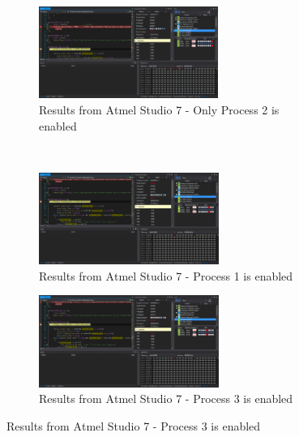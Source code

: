 \documentclass{article}
\begin{document}
	\begin{figure}[h!]
		\centering
		\begin{subfigure}[t]{0.5\textwidth}
			\centering
			\includegraphics[height=3cm,width=\linewidth]{./results/lab8_sim_proc_2.png}
			\caption{Results from Αtmel Studio 7 - Only Process 2 is enabled}
		\end{subfigure}%
		~
		\begin{subfigure}[t]{0.5\textwidth}
			\centering
			\includegraphics[height=3cm,width=\linewidth]{./results/lab8_sim_proc_1.png}
			\caption{Results from Αtmel Studio 7 - Process 1 is enabled }
		\end{subfigure}
		
		\begin{subfigure}[t]{0.5\textwidth}
			\centering
			\includegraphics[height=3cm,width=\linewidth]{./results/lab8_sim_proc_3.png}
			\caption{Results from Αtmel Studio 7 - Process 3 is enabled}
		\end{subfigure}
	\end{figure}
\end{document}
